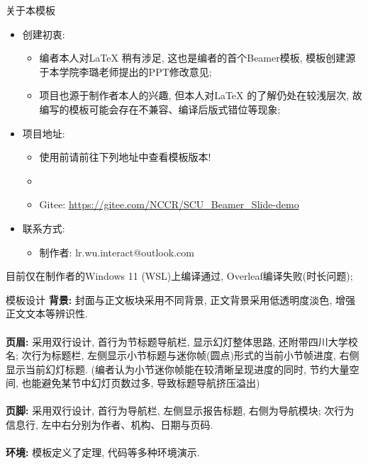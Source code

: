 \documentclass[hyperref, UTF8, CJK, aspectratio=169]{beamer}
\begin{document}
\begin{frame}{关于本模板}%
	\begin{itemize}
		\item 创建初衷:
		\begin{itemize}
			\item 编者本人对\LaTeX{} 稍有涉足, 这也是编者的首个Beamer模板, 模板创建源于本学院李璐老师提出的PPT修改意见;
			\item 项目也源于制作者本人的兴趣, 但本人对\LaTeX{} 的了解仍处在较浅层次, 故编写的模板可能会存在不兼容、编译后版式错位等现象;
		\end{itemize}
		\item 项目地址:
		\begin{itemize}
			\item 使用前请前往下列地址中查看模板版本!
			\item \faGithub{}
			\item Gitee: \color{scublue}\url{https://gitee.com/NCCR/SCU_Beamer_Slide-demo}
		\end{itemize}
		\item 联系方式:
		\begin{itemize}
			\item 制作者: lr.wu.interact@outlook.com
		\end{itemize}
	\end{itemize}
	目前仅在制作者的Windows 11 (WSL)上编译通过, Overleaf编译失败(时长问题);
\end{frame}

\begin{frame}{模板设计}
	\textbf{背景:} 封面与正文板块采用{\color{scured}不同背景}, 正文背景采用{\color{scured}低透明度淡色}, 增强正文文本等辨识性.\\~\\
	\textbf{页眉:} 采用双行设计, 首行为{\color{scured}节标题导航栏}, 显示幻灯整体思路, 还附带四川大学校名; 次行为标题栏, 左侧显示{\color{scured}小节标题}与{\color{scured}迷你帧(圆点)形式的当前小节帧进度}, 右侧显示当前{\color{scured}幻灯标题}. (编者认为小节迷你帧能在较清晰呈现进度的同时, 节约大量空间, 也能避免某节中幻灯页数过多, 导致标题导航挤压溢出)\\~\\
	\textbf{页脚:} 采用双行设计, 首行为导航栏, 左侧显示{\color{scured}报告标题}, 右侧为{\color{scured}导航模块}; 次行为信息行, 左中右分别为{\color{scured}作者}、{\color{scured}机构}、{\color{scured}日期与页码}.\\~\\
	\textbf{环境:} 模板定义了{\color{scured}定理}, {\color{scured}代码}等多种环境演示.
\end{frame}
\end{document}
